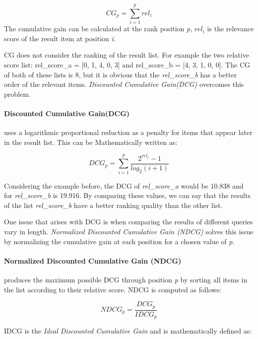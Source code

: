 \begin{equation}
    CG_p = \sum_{i=1}^{p}rel_i
    \label{eq:cg}
\end{equation}
The cumulative gain can be calculated at the rank position \emph{p}, \emph{$rel_i$} is the relevance score of the result item at position \emph{i}.

CG does not consider the ranking of the result list. For example the two relative score list: rel\_score\_a = [0, 1, 4, 0, 3] and rel\_score\_b = [4, 3, 1, 0, 0]. The CG of both of these lists is 8, but it is obvious that the \emph{rel\_score\_b} has a better order of the relevant items. \emph{Discounted Cumulative Gain(DCG)} overcomes this problem.

\paragraph*{Discounted Cumulative Gain(DCG)}
uses a logarithmic proportional reduction as a penalty for items that appear later in the result list. This can be Mathematically written as:

\begin{equation}
    DCG_p = \sum_{i=1}^{p}\frac{2^{rel_i}-1}{log_2(i+1)}
    \label{eq:dcg}
\end{equation}

Considering the example before, the DCG of \emph{rel\_score\_a} would be 10.838 and for \emph{rel\_score\_b} is 19.916. By comparing these values, we can say that the results of the list \emph{rel\_score\_b} have a better ranking quality than the other list.

One issue that arises with DCG is when comparing the results of different queries vary in length. \emph{Normalized Discounted Cumulative Gain (NDCG)} solves this issue by normalizing the cumulative gain at each position for a chosen value of \emph{p}.

\paragraph*{Normalized Discounted Cumulative Gain (NDCG)} 
produces the maximum possible DCG through position \emph{p} by sorting all items in the list according to their relative score. NDCG is computed as follows:

\begin{equation}
    NDCG_p = \frac{DCG_p}{IDCG_p}
    \label{eq:ndcg}
\end{equation}

IDCG is the \emph{Ideal Discounted Cumulative Gain} and is mathematically defined as:

